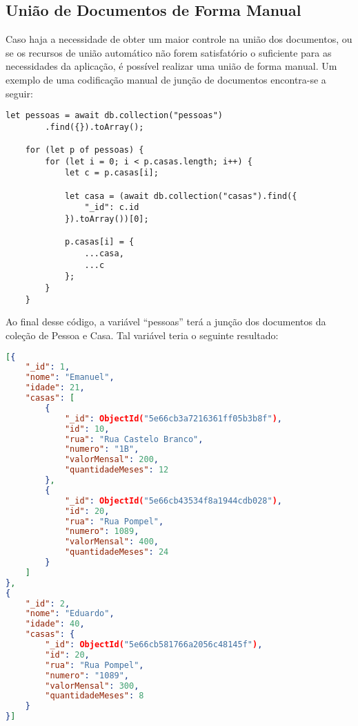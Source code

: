 \subsection{União de Documentos de Forma Manual}

Caso haja a necessidade de obter um maior controle na união dos documentos, ou se os recursos de união automático não forem satisfatório o suficiente para as necessidades da aplicação, é possível realizar uma união de forma manual. Um exemplo de uma codificação manual de junção de documentos encontra-se a seguir:

\newpage

\begin{lstlisting}[style=ES6, caption={Junção Manual dos Documentos de Pessoa com Casa}]
    let pessoas = await db.collection("pessoas")
        .find({}).toArray();
    
    for (let p of pessoas) {
        for (let i = 0; i < p.casas.length; i++) {
            let c = p.casas[i];
    
            let casa = (await db.collection("casas").find({
                "_id": c.id
            }).toArray())[0];
    
            p.casas[i] = {
                ...casa,
                ...c
            };
        }
    }
\end{lstlisting}

Ao final desse código, a variável ``pessoas'' terá a junção dos documentos da coleção de Pessoa e Casa. Tal variável teria o seguinte resultado:

\newpage

\begin{lstlisting}[language=json, caption={Junção de Documentos de Forma Manual}]
[{
    "_id": 1,
    "nome": "Emanuel",
    "idade": 21,
    "casas": [
        {
            "_id": ObjectId("5e66cb3a7216361ff05b3b8f"),
            "id": 10,
            "rua": "Rua Castelo Branco",
            "numero": "1B",
            "valorMensal": 200,
            "quantidadeMeses": 12
        },
        {
            "_id": ObjectId("5e66cb43534f8a1944cdb028"),
            "id": 20,
            "rua": "Rua Pompel",
            "numero": 1089,
            "valorMensal": 400,
            "quantidadeMeses": 24
        }
    ]
},
{
    "_id": 2,
    "nome": "Eduardo",
    "idade": 40,
    "casas": {
        "_id": ObjectId("5e66cb581766a2056c48145f"),
        "id": 20,
        "rua": "Rua Pompel",
        "numero": "1089",
        "valorMensal": 300,
        "quantidadeMeses": 8
    }
}]
\end{lstlisting}

